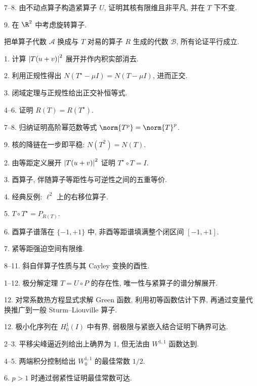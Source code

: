 7--8. 由不动点算子构造紧算子 $U$, 证明其核有限维且非平凡, 并在 $T$ 下不变.

9. 在 $\R^2$ 中考虑旋转算子.


把单算子代数 $\mathcal{A}$ 换成与 $T$ 对易的算子 $R$ 生成的代数 $\mathcal{B}$, 所有论证平行成立.


1. 计算 $\left|T(u+v)\right|^2$ 展开并作内积实部消去.

2. 利用正规性得出 $N(T^\star-\mu I)=N(T-\mu I)$, 进而正交.

3. 闭域定理与正规性给出正交补恒等式.

4--6. 证明 $R(T)=R(T^\star)$.

7--8. 归纳证明高阶幂范数等式 $\norm{T^p}=\norm{T}^p$.

9. 核的降链在一步即平稳: $N(T^2)=N(T)$.



2. 由等距定义展开 $\left|T(u+v)\right|^2$ 证明 $T^\star\circ T=I$.

3. 酉算子, 伴随算子等距性与可逆性之间的五重等价.

4. 经典反例: $\ell^2$ 上的右移位算子.

5. $T\circ T^\star=P_{R(T)}$.

6. 酉算子谱落在 $\{-1,+1\}$ 中, 非酉等距谱填满整个闭区间 $[-1,+1]$.

7. 紧等距强迫空间有限维.

8--11. 斜自伴算子性质与其 Cayley 变换的酉性.


1--12. 极分解定理 $T=U\circ P$ 的存在性, 唯一性与紧算子的谱分解展开.


12. 对常系数热方程显式求解 Green 函数, 利用初等函数估计下界, 再通过变量代换推广到一般 Sturm--Liouville 算子.


12. 极小化序列在 $H_0^1(I)$ 中有界, 弱极限与紧嵌入结合证明下确界可达.



2--3. 平移尖峰逼近列给出上确界为 1, 但无法由 $W^{1,1}$ 函数达到.

4--5. 两端积分控制给出 $W_0^{1,1}$ 的最佳常数 $1/2$.

6. $p>1$ 时通过弱紧性证明最佳常数可达.

